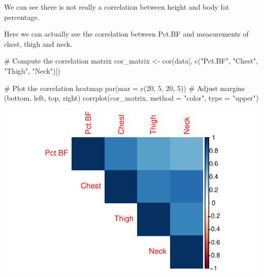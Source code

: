 \documentclass[
  letterpaper,
  DIV=11,
  numbers=noendperiod]{scrartcl}
\newenvironment{Shaded}{\begin{snugshade}}{\end{snugshade}}
\newcommand{\AttributeTok}[1]{\textcolor[rgb]{0.40,0.45,0.13}{#1}}
\newcommand{\CommentTok}[1]{\textcolor[rgb]{0.37,0.37,0.37}{#1}}
\newcommand{\DecValTok}[1]{\textcolor[rgb]{0.68,0.00,0.00}{#1}}
\newcommand{\FunctionTok}[1]{\textcolor[rgb]{0.28,0.35,0.67}{#1}}
\newcommand{\NormalTok}[1]{\textcolor[rgb]{0.00,0.23,0.31}{#1}}
\newcommand{\OtherTok}[1]{\textcolor[rgb]{0.00,0.23,0.31}{#1}}
\newcommand{\StringTok}[1]{\textcolor[rgb]{0.13,0.47,0.30}{#1}}
\begin{document}
We can see there is not really a correlation between height and body fat
percentage.

Here we can actually see the correlation between Pct.BF and measurements
of chest, thigh and neck.

\begin{Shaded}
\begin{Highlighting}[]
\CommentTok{\# Compute the correlation matrix}
\NormalTok{cor\_matrix }\OtherTok{\textless{}{-}} \FunctionTok{cor}\NormalTok{(data[, }\FunctionTok{c}\NormalTok{(}\StringTok{"Pct.BF"}\NormalTok{, }\StringTok{"Chest"}\NormalTok{, }\StringTok{"Thigh"}\NormalTok{, }\StringTok{"Neck"}\NormalTok{)])}

\CommentTok{\# Plot the correlation heatmap}
\FunctionTok{par}\NormalTok{(}\AttributeTok{mar =} \FunctionTok{c}\NormalTok{(}\DecValTok{20}\NormalTok{, }\DecValTok{5}\NormalTok{, }\DecValTok{20}\NormalTok{, }\DecValTok{5}\NormalTok{))  }\CommentTok{\# Adjust margins (bottom, left, top, right)}
\FunctionTok{corrplot}\NormalTok{(cor\_matrix, }\AttributeTok{method =} \StringTok{"color"}\NormalTok{, }\AttributeTok{type =} \StringTok{"upper"}\NormalTok{)}
\end{Highlighting}
\end{Shaded}

\includegraphics{Untitled_files/figure-pdf/unnamed-chunk-8-1.pdf}
\end{document}
